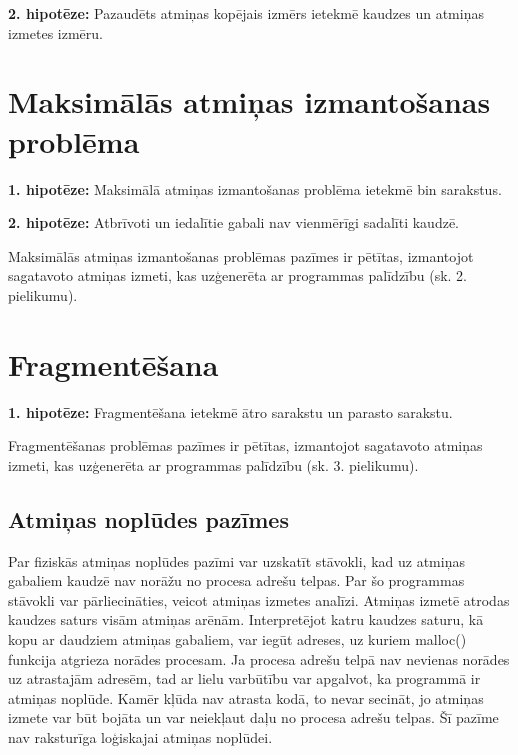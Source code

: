 \textbf{2. hipotēze:} Pazaudēts atmiņas kopējais izmērs ietekmē kaudzes un atmiņas izmetes izmēru.
\section{Maksimālās atmiņas izmantošanas problēma}


\textbf{1. hipotēze:} Maksimālā atmiņas izmantošanas problēma ietekmē bin sarakstus.

\textbf{2. hipotēze:} Atbrīvoti un iedalītie gabali nav vienmērīgi sadalīti kaudzē.

Maksimālās atmiņas izmantošanas problēmas pazīmes ir pētītas, izmantojot sagatavoto atmiņas izmeti, kas uzģenerēta ar programmas palīdzību (sk. 2. pielikumu).

\section{Fragmentēšana}


\textbf{1. hipotēze:} Fragmentēšana ietekmē ātro sarakstu un parasto sarakstu.

Fragmentēšanas problēmas pazīmes ir pētītas, izmantojot sagatavoto atmiņas izmeti, kas uzģenerēta ar programmas palīdzību (sk. 3. pielikumu).




\subsection{Atmiņas noplūdes pazīmes}





Par fiziskās atmiņas noplūdes pazīmi var uzskatīt stāvokli, kad uz atmiņas gabaliem kaudzē nav norāžu no procesa adrešu telpas.
Par šo programmas stāvokli var pārliecināties, veicot atmiņas izmetes analīzi.
Atmiņas izmetē atrodas kaudzes saturs visām atmiņas arēnām.
Interpretējot katru kaudzes saturu, kā kopu ar daudziem atmiņas gabaliem, var iegūt adreses, uz kuriem malloc() funkcija atgrieza norādes procesam.
Ja procesa adrešu telpā nav nevienas norādes uz atrastajām adresēm, tad ar lielu varbūtību var apgalvot, ka programmā ir atmiņas noplūde.
Kamēr kļūda nav atrasta kodā, to nevar secināt, jo atmiņas izmete var būt bojāta un var neiekļaut daļu no procesa adrešu telpas.
Šī pazīme nav raksturīga loģiskajai atmiņas noplūdei.



